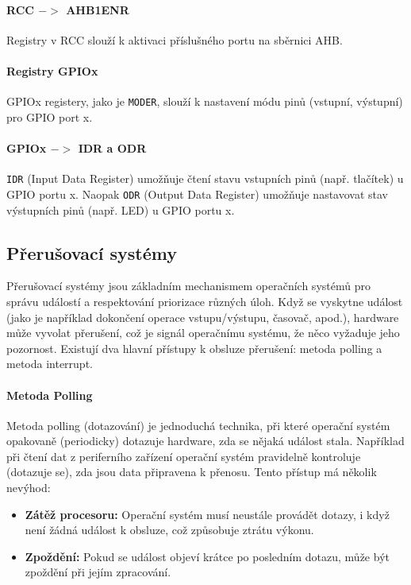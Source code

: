 \paragraph{RCC $->$ AHB1ENR}
Registry v RCC slouží k aktivaci příslušného portu na sběrnici AHB.

\paragraph{Registry GPIOx}
GPIOx registery, jako je \texttt{MODER}, slouží k nastavení módu pinů (vstupní, výstupní) pro GPIO port x.

\paragraph{GPIOx $->$ IDR a ODR}
\texttt{IDR} (Input Data Register) umožňuje čtení stavu vstupních pinů (např. tlačítek) u GPIO portu x. Naopak \texttt{ODR} (Output Data Register) umožňuje nastavovat stav výstupních pinů (např. LED) u GPIO portu x.

\subsection{Přerušovací systémy}
Přerušovací systémy jsou základním mechanismem operačních systémů pro správu událostí a respektování priorizace různých úloh. Když se vyskytne událost (jako je například dokončení operace vstupu/výstupu, časovač, apod.), hardware může vyvolat přerušení, což je signál operačnímu systému, že něco vyžaduje jeho pozornost. Existují dva hlavní přístupy k obsluze přerušení: metoda polling a metoda interrupt.

\ToDo

\paragraph{Metoda Polling}
Metoda polling (dotazování) je jednoduchá technika, při které operační systém opakovaně (periodicky) dotazuje hardware, zda se nějaká událost stala. Například při čtení dat z periferního zařízení operační systém pravidelně kontroluje (dotazuje se), zda jsou data připravena k přenosu. Tento přístup má několik nevýhod:
\begin{itemize}
    \item \textbf{Zátěž procesoru:} Operační systém musí neustále provádět dotazy, i když není žádná událost k obsluze, což způsobuje ztrátu výkonu.
    \item \textbf{Zpoždění:} Pokud se událost objeví krátce po posledním dotazu, může být zpoždění při jejím zpracování.
\end{itemize}
